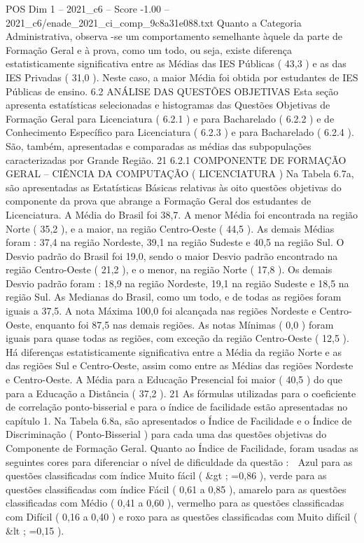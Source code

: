 \begin{textsample}{POS Dim 1 – 2021\_c6 – Score -1.00 – 2021\_c6/enade\_2021\_ci\_comp\_9c8a31e088.txt}
Quanto a Categoria Administrativa, observa -se um comportamento semelhante àquele da parte de Formação Geral e à prova, como um todo, ou seja, existe diferença estatisticamente significativa entre as Médias das IES Públicas ( 43,3 ) e as das IES Privadas ( 31,0 ).
Neste caso, a maior Média foi obtida por estudantes de IES Públicas de ensino. 6.2 ANÁLISE DAS QUESTÕES OBJETIVAS Esta seção apresenta estatísticas selecionadas e histogramas das Questões Objetivas de Formação Geral para Licenciatura ( 6.2.1 ) e para Bacharelado ( 6.2.2 ) e de Conhecimento Específico para Licenciatura ( 6.2.3 ) e para Bacharelado ( 6.2.4 ).
São, também, apresentadas e comparadas as médias das subpopulações caracterizadas por Grande Região. 21 6.2.1 COMPONENTE DE FORMAÇÃO GERAL – CIÊNCIA DA COMPUTAÇÃO ( LICENCIATURA ) Na Tabela 6.7a, são apresentadas as Estatísticas Básicas relativas às oito questões objetivas do componente da prova que abrange a Formação Geral dos estudantes de Licenciatura.
A Média do Brasil foi 38,7.
A menor Média foi encontrada na região Norte ( 35,2 ), e a maior, na região Centro-Oeste ( 44,5 ).
As demais Médias foram : 37,4 na região Nordeste, 39,1 na região Sudeste e 40,5 na região Sul.
O Desvio padrão do Brasil foi 19,0, sendo o maior Desvio padrão encontrado na região Centro-Oeste ( 21,2 ), e o menor, na região Norte ( 17,8 ).
Os demais Desvio padrão foram : 18,9 na região Nordeste, 19,1 na região Sudeste e 18,5 na região Sul.
As Medianas do Brasil, como um todo, e de todas as regiões foram iguais a 37,5.
A nota Máxima 100,0 foi alcançada nas regiões Nordeste e Centro-Oeste, enquanto foi 87,5 nas demais regiões.
As notas Mínimas ( 0,0 ) foram iguais para quase todas as regiões, com exceção da região Centro-Oeste ( 12,5 ).
Há diferenças estatisticamente significativa entre a Média da região Norte e as das regiões Sul e Centro-Oeste, assim como entre as Médias das regiões Nordeste e Centro-Oeste.
A Média para a Educação Presencial foi maior ( 40,5 ) do que para a Educação a Distância ( 37,2 ). 21 As fórmulas utilizadas para o coeficiente de correlação ponto-bisserial e para o índice de facilidade estão apresentadas no capítulo 1.
Na Tabela 6.8a, são apresentados o Índice de Facilidade e o Índice de Discriminação ( Ponto-Bisserial ) para cada uma das questões objetivas do Componente de Formação Geral.
Quanto ao Índice de Facilidade, foram usadas as seguintes cores para diferenciar o nível de dificuldade da questão :  Azul para as questões classificadas com índice Muito fácil ( \&gt ; =0,86 ), verde para as questões classificadas com índice Fácil ( 0,61 a 0,85 ), amarelo para as questões classificadas com Médio ( 0,41 a 0,60 ), vermelho para as questões classificadas com Difícil ( 0,16 a 0,40 ) e roxo para as questões classificadas com Muito difícil ( \&lt ; =0,15 ).

\end{textsample}
